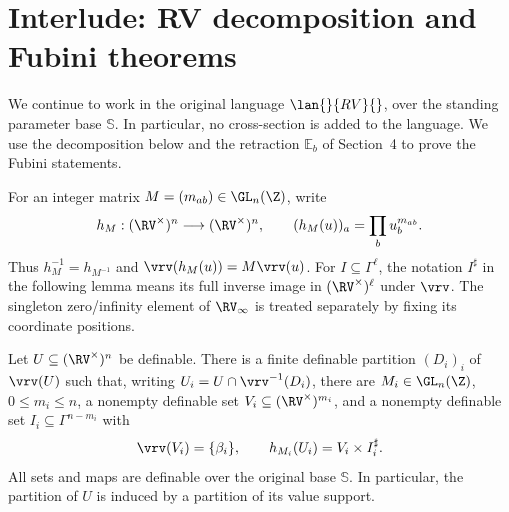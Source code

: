 \section{Interlude: RV decomposition and Fubini theorems}\label{csndag}

We continue to work in the original language $\lan{}{RV}{}$, over the
standing parameter base $\mathbb S$. In particular, no cross-section is
added to the language. We use the decomposition below and the
retraction $\mathbb E_b$ of Section~4 to prove the Fubini statements.

For an integer matrix $M=(m_{ab})\in\GL_n(\Z)$, write
\[
 h_M:(\RV^\times)^n\longrightarrow(\RV^\times)^n,\qquad
 (h_M(u))_a=\prod_b u_b^{m_{ab}}.
\]
Thus $h_M^{-1}=h_{M^{-1}}$ and
$\vrv(h_M(u))=M\vrv(u)$. For $I\subseteq\Gamma^\ell$, the notation
$I^\sharp$ in the following lemma means its full inverse image in
$(\RV^\times)^\ell$ under $\vrv$. The singleton zero/infinity element
of $\RV_\infty$ is treated separately by fixing its coordinate positions.

\setcounter{thm}{11}
\begin{lem}\label{coh:decom}
Let $U\subseteq(\RV^\times)^n$ be definable. There is a finite definable
partition $(D_i)_i$ of $\vrv(U)$ such that, writing
$U_i=U\cap\vrv^{-1}(D_i)$, there are $M_i\in\GL_n(\Z)$,
$0\leq m_i\leq n$, a nonempty definable set
$V_i\subseteq(\RV^\times)^{m_i}$, and a nonempty definable set
$I_i\subseteq\Gamma^{n-m_i}$ with
\[
 \vrv(V_i)=\{\beta_i\},\qquad
 h_{M_i}(U_i)=V_i\times I_i^\sharp .
\]
All sets and maps are definable over the original base $\mathbb S$.
In particular, the partition of $U$ is induced by a partition of
its value support.
\end{lem}

